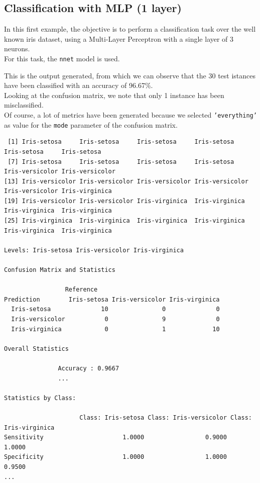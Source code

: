 \documentclass{article}
\begin{document}
\subsection{Classification with MLP (1 layer)}
In this first example, the objective is to perform a classification task over the well known iris dataset, using a Multi-Layer Perceptron with a single layer of 3 neurons.\\
For this task, the \texttt{nnet} model is used.\\



\pagebreak

This is the output generated, from which we can observe that the 30 test istances have been classified with an accuracy of 96.67\%.\\

Looking at the confusion matrix, we note that only 1 instance has been misclassified.\\

Of course, a lot of metrics have been generated because we selected \texttt{'everything'} as value for the \texttt{mode} parameter of the confusion matrix.\\

\begin{lstlisting}
 [1] Iris-setosa     Iris-setosa     Iris-setosa     Iris-setosa     Iris-setosa     Iris-setosa    
 [7] Iris-setosa     Iris-setosa     Iris-setosa     Iris-setosa     Iris-versicolor Iris-versicolor
[13] Iris-versicolor Iris-versicolor Iris-versicolor Iris-versicolor Iris-versicolor Iris-virginica 
[19] Iris-versicolor Iris-versicolor Iris-virginica  Iris-virginica  Iris-virginica  Iris-virginica 
[25] Iris-virginica  Iris-virginica  Iris-virginica  Iris-virginica  Iris-virginica  Iris-virginica 

Levels: Iris-setosa Iris-versicolor Iris-virginica

Confusion Matrix and Statistics

                 Reference
Prediction        Iris-setosa Iris-versicolor Iris-virginica
  Iris-setosa              10               0              0
  Iris-versicolor           0               9              0
  Iris-virginica            0               1             10

Overall Statistics
                                          
               Accuracy : 0.9667          
               ...            

Statistics by Class:

                     Class: Iris-setosa Class: Iris-versicolor Class: Iris-virginica
Sensitivity                      1.0000                 0.9000                1.0000
Specificity                      1.0000                 1.0000                0.9500
...

\end{lstlisting}
\end{document}
